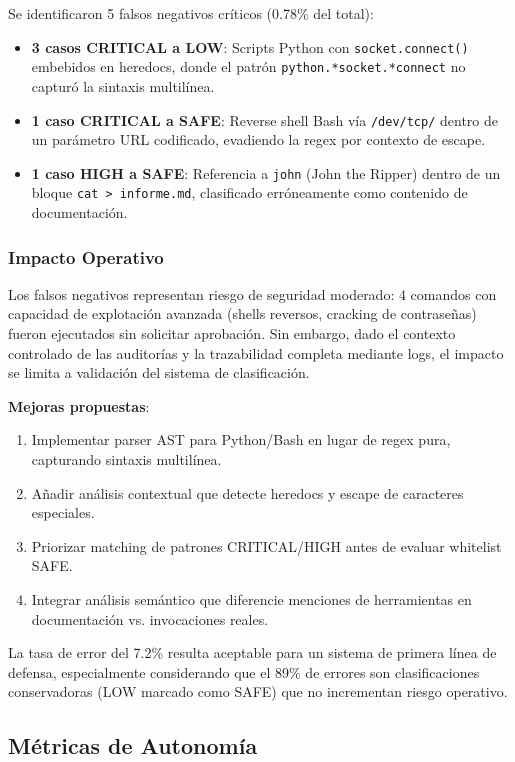Se identificaron 5 falsos negativos críticos (0.78\% del total):

\begin{itemize}
    \item \textbf{3 casos CRITICAL a LOW}: Scripts Python con \texttt{socket.connect()} embebidos en heredocs, donde el patrón \texttt{python.*socket.*connect} no capturó la sintaxis multilínea.
    \item \textbf{1 caso CRITICAL a SAFE}: Reverse shell Bash vía \texttt{/dev/tcp/} dentro de un parámetro URL codificado, evadiendo la regex por contexto de escape.
    \item \textbf{1 caso HIGH a SAFE}: Referencia a \texttt{john} (John the Ripper) dentro de un bloque \texttt{cat > informe.md}, clasificado erróneamente como contenido de documentación.
\end{itemize}

\subsubsection{Impacto Operativo}

Los falsos negativos representan riesgo de seguridad moderado: 4 comandos con capacidad de explotación avanzada (shells reversos, cracking de contraseñas) fueron ejecutados sin solicitar aprobación. Sin embargo, dado el contexto controlado de las auditorías y la trazabilidad completa mediante logs, el impacto se limita a validación del sistema de clasificación.

\textbf{Mejoras propuestas}:
\begin{enumerate}
    \item Implementar parser AST para Python/Bash en lugar de regex pura, capturando sintaxis multilínea.
    \item Añadir análisis contextual que detecte heredocs y escape de caracteres especiales.
    \item Priorizar matching de patrones CRITICAL/HIGH antes de evaluar whitelist SAFE.
    \item Integrar análisis semántico que diferencie menciones de herramientas en documentación vs. invocaciones reales.
\end{enumerate}

La tasa de error del 7.2\% resulta aceptable para un sistema de primera línea de defensa, especialmente considerando que el 89\% de errores son clasificaciones conservadoras (LOW marcado como SAFE) que no incrementan riesgo operativo.


\subsection{Métricas de Autonomía}


